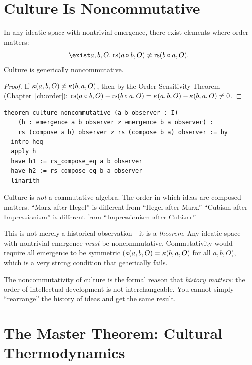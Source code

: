 \section{Culture Is Noncommutative}

\begin{theorem}
\label{thm:noncommutative}
In any ideatic space with nontrivial emergence, there exist
elements where order matters:
\[
  \exist a, b, O.\;
  \rs(a \compose b, O) \neq \rs(b \compose a, O).
\]
Culture is generically noncommutative.
\end{theorem}

\begin{proof}
If $\kappa(a, b, O) \neq \kappa(b, a, O)$, then by the Order
Sensitivity Theorem (Chapter~\ref{ch:order}):
$\mathrm{rs}(a \circ b, O) - \mathrm{rs}(b \circ a, O) =
\kappa(a, b, O) - \kappa(b, a, O) \neq 0$.
\end{proof}

\begin{lstlisting}
theorem culture_noncommutative (a b observer : I)
    (h : emergence a b observer ≠ emergence b a observer) :
    rs (compose a b) observer ≠ rs (compose b a) observer := by
  intro heq
  apply h
  have h1 := rs_compose_eq a b observer
  have h2 := rs_compose_eq b a observer
  linarith
\end{lstlisting}

\begin{remark}
Culture is \emph{not} a commutative algebra.  The order in which ideas
are composed matters.  ``Marx after Hegel'' is different from ``Hegel
after Marx.''  ``Cubism after Impressionism'' is different from
``Impressionism after Cubism.''

This is not merely a historical observation---it is a \emph{theorem}.
Any ideatic space with nontrivial emergence \emph{must} be
noncommutative.  Commutativity would require all emergence to be
symmetric ($\kappa(a,b,O) = \kappa(b,a,O)$ for all $a,b,O$), which
is a very strong condition that generically fails.

The noncommutativity of culture is the formal reason that \emph{history
matters}: the order of intellectual development is not interchangeable.
You cannot simply ``rearrange'' the history of ideas and get the same
result.
\end{remark}

\section{The Master Theorem: Cultural Thermodynamics}

